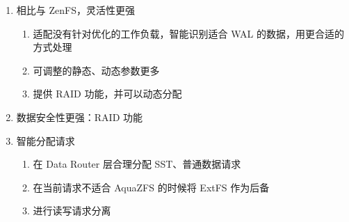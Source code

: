 \begin{enumerate}
    \item 相比与 ZenFS，灵活性更强
    \begin{enumerate}
        \item 适配没有针对优化的工作负载，智能识别适合 WAL 的数据，用更合适的方式处理
        \item 可调整的静态、动态参数更多
        \item 提供 RAID 功能，并可以动态分配
    \end{enumerate}
    \item 数据安全性更强：RAID 功能
    \item 智能分配请求
    \begin{enumerate}
        \item 在 Data Router 层合理分配 SST、普通数据请求
        \item 在当前请求不适合 AquaZFS 的时候将 ExtFS 作为后备
        \item 进行读写请求分离
    \end{enumerate}
\end{enumerate}

